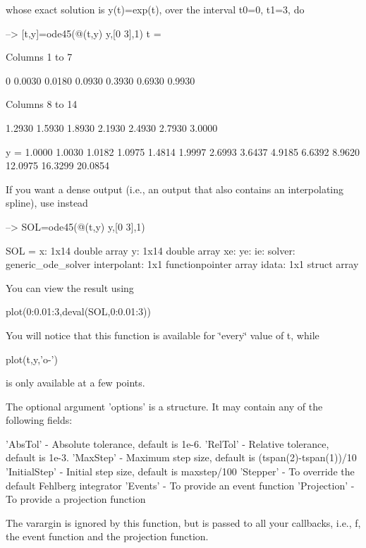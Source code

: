 whose exact solution is y(t)=exp(t), over the interval t0=0, t1=3, do


\begin{DoxyVerbInclude}
-->       [t,y]=ode45(@(t,y) y,[0 3],1)
t = 

 Columns 1 to 7

         0    0.0030    0.0180    0.0930    0.3930    0.6930    0.9930 

 Columns 8 to 14

    1.2930    1.5930    1.8930    2.1930    2.4930    2.7930    3.0000 

y = 
    1.0000 
    1.0030 
    1.0182 
    1.0975 
    1.4814 
    1.9997 
    2.6993 
    3.6437 
    4.9185 
    6.6392 
    8.9620 
   12.0975 
   16.3299 
   20.0854 
\end{DoxyVerbInclude}


If you want a dense output (i.\-e., an output that also contains an interpolating spline), use instead


\begin{DoxyVerbInclude}
-->       SOL=ode45(@(t,y) y,[0 3],1)

SOL = 
    x: 1x14 double array
    y: 1x14 double array
    xe: 
    ye: 
    ie: 
    solver: generic_ode_solver
    interpolant: 1x1 functionpointer array
    idata: 1x1 struct array
\end{DoxyVerbInclude}


You can view the result using \begin{DoxyVerb}      plot(0:0.01:3,deval(SOL,0:0.01:3))
\end{DoxyVerb}
 You will notice that this function is available for \char`\"{}every\char`\"{} value of t, while \begin{DoxyVerb} plot(t,y,'o-')
\end{DoxyVerb}


is only available at a few points.

The optional argument 'options' is a structure. It may contain any of the following fields\-:

'Abs\-Tol' -\/ Absolute tolerance, default is 1e-\/6. 'Rel\-Tol' -\/ Relative tolerance, default is 1e-\/3. 'Max\-Step' -\/ Maximum step size, default is (tspan(2)-\/tspan(1))/10 'Initial\-Step' -\/ Initial step size, default is maxstep/100 'Stepper' -\/ To override the default Fehlberg integrator 'Events' -\/ To provide an event function 'Projection' -\/ To provide a projection function

The varargin is ignored by this function, but is passed to all your callbacks, i.\-e., f, the event function and the projection function.


